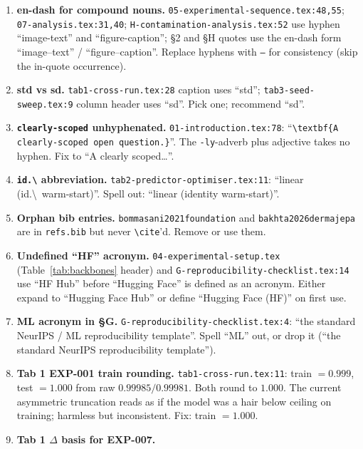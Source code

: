 \documentclass[11pt,a4paper]{article}
\begin{document}
\begin{enumerate}[leftmargin=2em]
\item \textbf{en-dash for compound nouns.} \texttt{05-experimental-sequence.tex:48,55};
      \texttt{07-analysis.tex:31,40};
      \texttt{H-contamination-analysis.tex:52} use hyphen ``image-text''
      and ``figure-caption''; \S2 and \S H quotes use the en-dash form
      ``image--text'' / ``figure--caption''. Replace hyphens with
      \texttt{--} for consistency (skip the in-quote occurrence).
\item \textbf{std vs sd.} \texttt{tab1-cross-run.tex:28} caption uses
      ``std''; \texttt{tab3-seed-sweep.tex:9} column header uses ``sd''.
      Pick one; recommend ``sd''.
\item \textbf{\texttt{clearly-scoped} unhyphenated.}
      \texttt{01-introduction.tex:78}: ``\texttt{\textbackslash textbf\{A
      clearly-scoped open question.\}}''. The \texttt{-ly}-adverb plus
      adjective takes no hyphen. Fix to ``A clearly scoped\dots''.
\item \textbf{\texttt{id.\textbackslash} abbreviation.}
      \texttt{tab2-predictor-optimiser.tex:11}: ``linear (id.\textbackslash\
      warm-start)''. Spell out: ``linear (identity warm-start)''.
\item \textbf{Orphan bib entries.} \texttt{bommasani2021foundation} and
      \texttt{bakhta2026dermajepa} are in \texttt{refs.bib} but never
      \texttt{\textbackslash cite}'d. Remove or use them.
\item \textbf{Undefined ``HF'' acronym.}
      \texttt{04-experimental-setup.tex} (Table~\ref{tab:backbones}
      header) and \texttt{G-reproducibility-checklist.tex:14} use ``HF
      Hub'' before ``Hugging Face'' is defined as an acronym. Either
      expand to ``Hugging Face Hub'' or define ``Hugging Face (HF)''
      on first use.
\item \textbf{ML acronym in \S G.}
      \texttt{G-reproducibility-checklist.tex:4}: ``the standard NeurIPS /
      ML reproducibility template''. Spell ``ML'' out, or drop it
      (``the standard NeurIPS reproducibility template'').
\item \textbf{Tab 1 EXP-001 train rounding.}
      \texttt{tab1-cross-run.tex:11}: train $= 0.999$, test $= 1.000$
      from raw $0.99985 / 0.99981$. Both round to $1.000$. The current
      asymmetric truncation reads as if the model was a hair below
      ceiling on training; harmless but inconsistent.
      Fix: train $= 1.000$.
\item \textbf{Tab 1 $\Delta$ basis for EXP-007.}

\end{enumerate}
\end{document}
